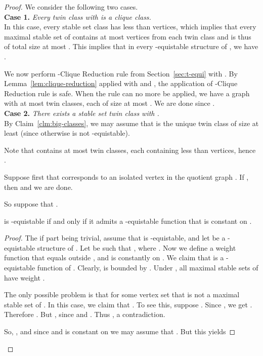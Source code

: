 \documentclass{llncs}
\begin{document}
\begin{proof}
We consider the following two cases.\\

\noindent
\textbf{Case 1.} \emph{Every twin class  with  is a clique class.}\\

In this case, every stable set class has less than  vertices, which implies that every maximal stable set of  contains at most
 vertices from each twin class and is thus of total size at most .
This implies that in every -equistable structure  of , we have .

We now perform -Clique Reduction rule from Section~\ref{sec:t-equi} with .
By Lemma~\ref{lem:clique-reduction} applied with  and , the application of -Clique Reduction rule is safe.
When the rule can no more be applied, we have a graph  with at most  twin classes, each of size at most
.
We are done since .\\
	
\noindent
\textbf{Case 2.} \emph{There exists a stable set twin class  with .}\\

\noindent
By Claim~\ref{clm:big-classes}, we may assume that  is the unique twin class of size at least 
(since otherwise  is not -equistable).

Note that  contains at most  twin classes, each containing less than  vertices, 
hence .

Suppose first that  corresponds to an isolated vertex in the quotient graph .
If , then  and we are done.

So suppose that .

\begin{Claim}\label{claim}
 is -equistable if and only if it admits a -equistable function that is constant on .
\end{Claim}

\begin{proof}
The if part being trivial, assume that  is -equistable, and let  be a -equistable structure of .
Let  be such that , where .
Now we define a weight function  that equals  outside , and is constantly  on .
We claim that  is a -equistable function of . Clearly,  is bounded by .
Under , all maximal stable sets of  have weight .

The only possible problem is that  for some vertex set  that is not a maximal stable set of .
In this case, we claim that . To see this, suppose . 
Since  , we get .
Therefore 
.
But , since  and . Thus
, a contradiction.

So, , and since  and  is constant on  we may assume that
. But this yields


\end{proof}
\end{proof}
\end{document}
